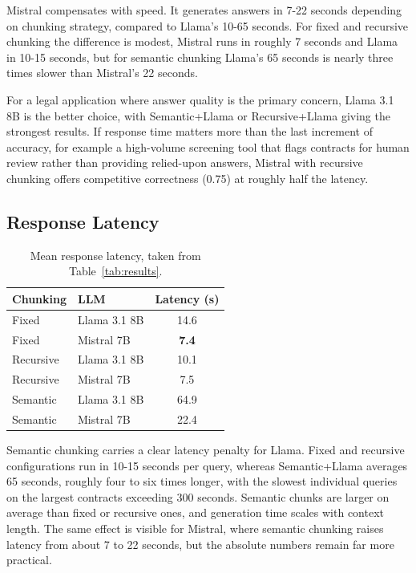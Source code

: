 Mistral compensates with speed. It generates answers in 7-22 seconds depending on chunking strategy, compared to Llama's 10-65 seconds. For fixed and recursive chunking the difference is modest, Mistral runs in roughly 7 seconds and Llama in 10-15 seconds, but for semantic chunking Llama's 65 seconds is nearly three times slower than Mistral's 22 seconds.

For a legal application where answer quality is the primary concern, Llama 3.1 8B is the better choice, with Semantic+Llama or Recursive+Llama giving the strongest results. If response time matters more than the last increment of accuracy, for example a high-volume screening tool that flags contracts for human review rather than providing relied-upon answers, Mistral with recursive chunking offers competitive correctness (0.75) at roughly half the latency.

\subsection{Response Latency}

\begin{table}[ht]
\centering
\begin{tabular}{llc}
\toprule
\textbf{Chunking} & \textbf{LLM} & \textbf{Latency (s)} \\
\midrule
Fixed     & Llama 3.1 8B & 14.6 \\
Fixed     & Mistral 7B   & \textbf{7.4} \\
Recursive & Llama 3.1 8B & 10.1 \\
Recursive & Mistral 7B   & 7.5 \\
Semantic  & Llama 3.1 8B & 64.9 \\
Semantic  & Mistral 7B   & 22.4 \\
\bottomrule
\end{tabular}
\caption{Mean response latency, taken from Table~\ref{tab:results}.}
\label{tab:excerpt-latency}
\end{table}

Semantic chunking carries a clear latency penalty for Llama. Fixed and recursive configurations run in 10-15 seconds per query, whereas Semantic+Llama averages 65 seconds, roughly four to six times longer, with the slowest individual queries on the largest contracts exceeding 300 seconds. Semantic chunks are larger on average than fixed or recursive ones, and generation time scales with context length. The same effect is visible for Mistral, where semantic chunking raises latency from about 7 to 22 seconds, but the absolute numbers remain far more practical.

